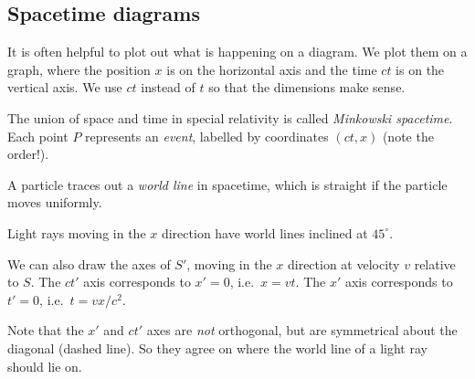 \documentclass[a4paper]{article}
\begin{document}
\subsection{Spacetime diagrams}
It is often helpful to plot out what is happening on a diagram. We plot them on a graph, where the position $x$ is on the horizontal axis and the time $ct$ is on the vertical axis. We use $ct$ instead of $t$ so that the dimensions make sense.
\begin{center}
\end{center}
\begin{defi}[Spacetime]
  The union of space and time in special relativity is called \emph{Minkowski spacetime}. Each point $P$ represents an \emph{event}, labelled by coordinates $(ct, x)$ (note the order!).

  A particle traces out a \emph{world line} in spacetime, which is straight if the particle moves uniformly.

  Light rays moving in the $x$ direction have world lines inclined at $45^\circ$.
  \begin{center}
  \end{center}
\end{defi}

We can also draw the axes of $S'$, moving in the $x$ direction at velocity $v$ relative to $S$. The $ct'$ axis corresponds to $x' = 0$, i.e.\ $x = vt$. The $x'$ axis corresponds to $t' = 0$, i.e.\ $t = vx/c^2$.
\begin{center}
\end{center}
Note that the $x'$ and $ct'$ axes are \emph{not} orthogonal, but are symmetrical about the diagonal (dashed line). So they agree on where the world line of a light ray should lie on.
\end{document}
